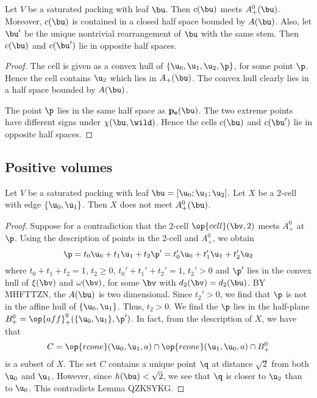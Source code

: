 \begin{lemma}  Let $V$ be a saturated packing with leaf $\bu$.
Then $c(\bu)$ meets $A_+^0(\bu)$.
Moreover, $c(\bu)$ is contained in a closed half space bounded by $A(\bu)$.
Also, let $\bu'$ be the unique nontrivial rearrangement of $\bu$ with the same stem.
Then $c(\bu)$ and $c(\bu')$ lie in opposite half spaces.
\end{lemma}

\begin{proof} The cell is given as a convex hull of $\{\u_0,\u_1,\u_2,\p\}$, for some point $\p$.
Hence the cell contains $\u_2$ which lies in $A_+(\bu)$.   The convex hull clearly lies in a half
space bounded by $A(\bu)$.

The point $\p$ lies in the same half space as $\pe(\bu)$.  The two extreme points have different
signs under $\chi(\bu,\wild)$.  Hence the cells $c(\bu)$ and $c(\bu')$ lie in opposite half spaces.
\end{proof}


\subsection{Positive volumes}

\begin{lemma}\label{lemma:em2}  Let $V$ be a saturated packing with leaf $\bu=[\u_0;\u_1;\u_2]$. Let $X$ be a
$2$-cell with edge $\{ \u_0,\u_1 \}$.  Then $X$ does not meet $A_+^0(\bu)$.
\end{lemma}

\begin{proof} Suppose for a contradiction that the $2$-cell $\op{cell}(\bv,2)$ 
meets $A_+^0$ at $\p$.  Using the description
of points in the $2$-cell and $A_+^0$, we obtain
\[
\p = t_0 \u_0 + t_1 \u_1 + t_2 \p' = t_0' \u_0 + t_1' \u_1 + t_2' \u_2
\]
where $t_0 + t_1 + t_2 = 1$, $t_2\ge 0$, $t_0'+t_1'+t_2'=1$, $t_2'>0$ and $\p'$ lies in the convex
hull of $\xi(\bv)$ and $\omega(\bv)$, for some $\bv$ with $d_2(\bv) = d_2(\bu)$.
BY MHFTTZN, the $A(\bu)$ is two dimensional.  Since $t_2'>0$, we find that $\p$ is not
in the affine hull of $\{\u_0,\u_1\}$.  Thus, $t_2 > 0$.  We find the $\p$ lies in the
half-plane  $B^0_+ = \op{aff}_+^0(\{\u_0,\u_1\},\p')$.  In fact, from the description of $X$, we have that
\[
C = \op{rcone}(\u_0,\u_1,a) \cap \op{rcone}(\u_1,\u_0,a) \cap B^0_+
\]
is a subset of $X$.  The set $C$ contains a unique point $\q$ at distance $\sqrt2$ from both $\u_0$ and
$\u_1$.  However, since $h(\bu)<\sqrt2$, we see that  $\q$ is closer to $\u_2$ than to $\u_0$.
This contradicts Lemma QZKSYKG.
\end{proof}

